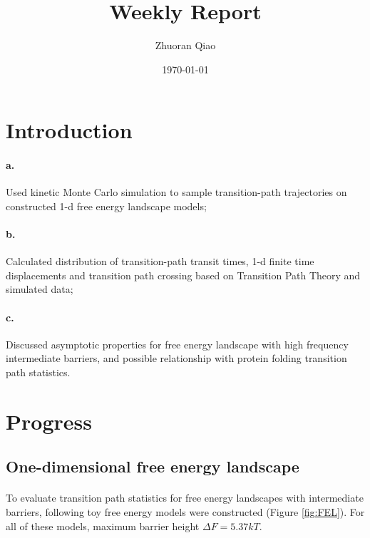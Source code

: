 \documentclass[11pt, a4paper]{article}
\begin{document}
\title{Weekly Report}
\author{Zhuoran Qiao}
\date{\today}

\maketitle

\section{Introduction}
\paragraph{a.} Used kinetic Monte Carlo simulation to sample transition-path trajectories on constructed 1-d free energy landscape models;
\paragraph{b.} Calculated distribution of transition-path transit times, 1-d finite time displacements and transition path crossing based on Transition Path Theory and simulated data;
\paragraph{c.} Discussed asymptotic properties for free energy landscape with high frequency intermediate barriers, and possible relationship with protein folding transition path statistics.

\section{Progress}
\subsection{One-dimensional free energy landscape}

\paragraph{}To evaluate transition path statistics for free energy landscapes with intermediate barriers,
 following toy free energy models were constructed (Figure \ref{fig:FEL}). For all of these models, maximum barrier height $\Delta F=5.37kT$.
\end{document}
